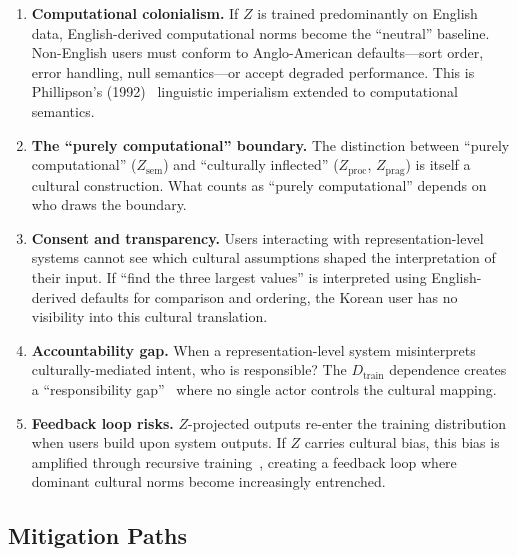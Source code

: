 \documentclass[11pt]{article}
\theoremstyle{definition}
\newcommand{\Zsem}{Z_{\text{sem}}}
\newcommand{\Zproc}{Z_{\text{proc}}}
\newcommand{\Zprag}{Z_{\text{prag}}}
\newcommand{\Dtrain}{D_{\text{train}}}
\begin{document}
\begin{enumerate}[nosep]
  \item \textbf{Computational colonialism.} If $Z$ is trained predominantly on English data, English-derived computational norms become the ``neutral'' baseline. Non-English users must conform to Anglo-American defaults---sort order, error handling, null semantics---or accept degraded performance. This is Phillipson's (1992)~\cite{phillipson1992} linguistic imperialism extended to computational semantics.

  \item \textbf{The ``purely computational'' boundary.} The distinction between ``purely computational'' ($\Zsem$) and ``culturally inflected'' ($\Zproc$, $\Zprag$) is itself a cultural construction. What counts as ``purely computational'' depends on who draws the boundary.

  \item \textbf{Consent and transparency.} Users interacting with representation-level systems cannot see which cultural assumptions shaped the interpretation of their input. If ``find the three largest values'' is interpreted using English-derived defaults for comparison and ordering, the Korean user has no visibility into this cultural translation.

  \item \textbf{Accountability gap.} When a representation-level system misinterprets culturally-mediated intent, who is responsible? The $\Dtrain$ dependence creates a ``responsibility gap''~\cite{matthias2004} where no single actor controls the cultural mapping.

  \item \textbf{Feedback loop risks.} $Z$-projected outputs re-enter the training distribution when users build upon system outputs. If $Z$ carries cultural bias, this bias is amplified through recursive training~\cite{shumailov2024collapse}, creating a feedback loop where dominant cultural norms become increasingly entrenched.
\end{enumerate}

\subsection{Mitigation Paths}
\end{document}
